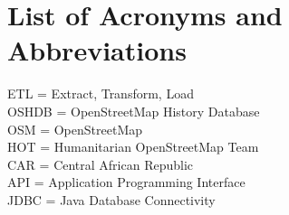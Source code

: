 \chapter*{List of Acronyms and Abbreviations}

ETL = Extract, Transform, Load \\
OSHDB = OpenStreetMap History Database \\
OSM = OpenStreetMap \\
HOT = Humanitarian OpenStreetMap Team \\
CAR = Central African Republic \\
API = Application Programming Interface \\
JDBC = Java Database Connectivity \\
